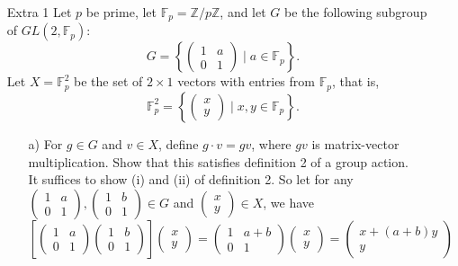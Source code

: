 \documentclass[12pt]{article}
\begin{document}
\begin{enumerate}
\item[Extra 1] Let $p$ be prime, let $\mathbb{F}_p = \mathbb{Z}/p\mathbb{Z}$, and let $G$ be the following subgroup of $GL(2, \mathbb{F}_p)$:
\[
G = \left\{
\left(
\begin{array}{cc}
1 & a \\ 0 & 1
\end{array}
\right) \mid a \in \mathbb{F}_p
\right\} .
\]
Let $X = \mathbb{F}^2_p$ be the set of $2 \times 1$ vectors with entries from $\mathbb{F}_p$, that is,
\[
\mathbb{F}^2_p = \left\{
\left(
\begin{array}{c}
x \\ y
\end{array}
\right) \mid x, y \in \mathbb{F}_p
\right\} .
\]
\begin{enumerate}
\item[a)] For $g \in G$ and $v \in X$, define $g \cdot v = gv$, where $gv$ is matrix-vector multiplication. Show that this satisfies definition 2 of a group action. \\
It suffices to show (i) and (ii) of definition 2. So let for any 
$\left( \begin{array}{cc} 1 & a \\ 0 & 1\end{array}\right), \left( \begin{array}{cc} 1 & b \\ 0 & 1\end{array}
\right) \in G$ and $\left( \begin{array}{c} x \\ y\end{array}\right) \in X$, we have
\[
\left[ \left( \begin{array}{cc} 1 & a \\ 0 & 1\end{array}\right) \left( \begin{array}{cc} 1 & b \\ 0 & 1\end{array} \right)
\right] \left( \begin{array}{c} x \\ y\end{array}\right) = 
\left( \begin{array}{cc} 1 & a + b \\ 0 & 1\end{array}\right) \left( \begin{array}{c} x \\ y\end{array}\right)
= \left( \begin{array}{c} x + (a + b)y \\ y\end{array}\right)
\]
\end{enumerate}
\end{enumerate}
\end{document}
